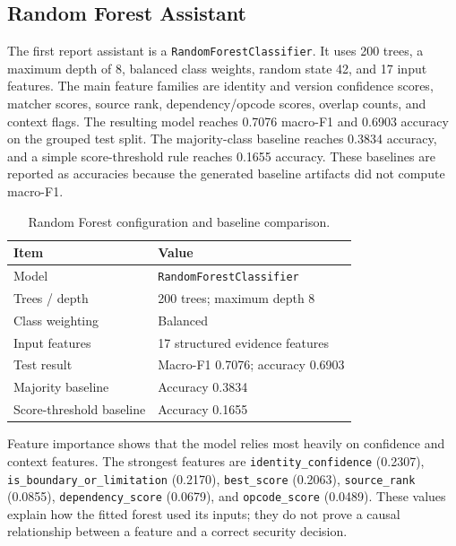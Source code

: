 \subsection{Random Forest Assistant}

The first report assistant is a \texttt{RandomForestClassifier}. It uses 200
trees, a maximum depth of 8, balanced class weights, random state 42, and 17
input features. The main feature families are identity and version confidence
scores, matcher scores, source rank, dependency/opcode scores, overlap
counts, and context flags. The resulting model reaches 0.7076 macro-F1 and
0.6903 accuracy on the grouped test split. The majority-class baseline reaches
0.3834 accuracy, and a simple score-threshold rule reaches 0.1655 accuracy.
These baselines are reported as accuracies because the generated baseline
artifacts did not compute macro-F1.

\begin{table}[H]
\centering
\caption{Random Forest configuration and baseline comparison.}
\label{tab:pfe-ai-rf-configuration}
\begin{tabularx}{\textwidth}{L{0.35\textwidth}X}
\toprule
\textbf{Item} & \textbf{Value}\\
\midrule
Model & \texttt{RandomForestClassifier}\\
Trees / depth & 200 trees; maximum depth 8\\
Class weighting & Balanced\\
Input features & 17 structured evidence features\\
Test result & Macro-F1 0.7076; accuracy 0.6903\\
Majority baseline & Accuracy 0.3834\\
Score-threshold baseline & Accuracy 0.1655\\
\bottomrule
\end{tabularx}
\end{table}

Feature importance shows that the model relies most heavily on confidence and
context features. The strongest features are \texttt{identity\_confidence}
(0.2307), \texttt{is\_boundary\_or\_limitation} (0.2170), \texttt{best\_score}
(0.2063), \texttt{source\_rank} (0.0855), \texttt{dependency\_score}
(0.0679), and \texttt{opcode\_score} (0.0489). These values explain how the
fitted forest used its inputs; they do not prove a causal relationship between
a feature and a correct security decision.

